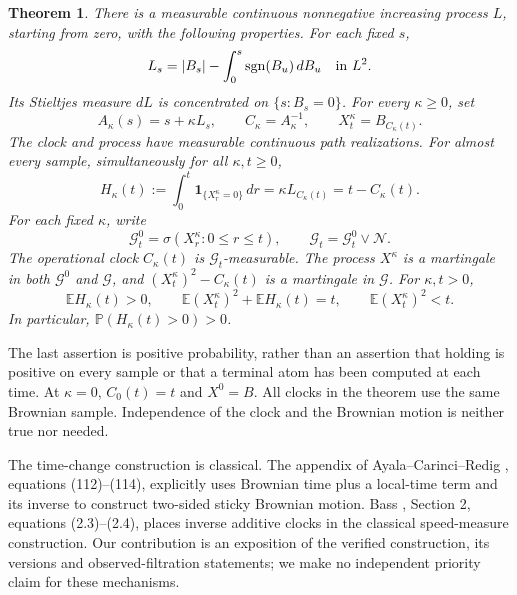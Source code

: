 \documentclass[11pt]{article}
\newtheorem{theorem}{Theorem}[section]
\newcommand{\E}{\mathbb E}
\newcommand{\Pp}{\mathbb P}
\newcommand{\ind}{\mathbf1}
\newcommand{\G}{\mathcal G}
\newcommand{\N}{\mathcal N}
\begin{document}
\begin{theorem}\label{thm:main}
There is a measurable continuous nonnegative increasing process $L$,
starting from zero, with the following properties. For each fixed $s$,
\begin{equation}\label{eq:tanakaL2}
 L_s=|B_s|-\int_0^s\operatorname{sgn}(B_u)\,dB_u\quad\hbox{in }L^2.
\end{equation}
Its Stieltjes measure $dL$ is concentrated on $\{s:B_s=0\}$.
For every $\kappa\geq0$, set
\begin{equation}\label{eq:clocks}
 A_\kappa(s)=s+\kappa L_s,\qquad
 C_\kappa=A_\kappa^{-1},\qquad X_t^\kappa=B_{C_\kappa(t)}.
\end{equation}
The clock and process have measurable continuous path realizations.
For almost every sample, simultaneously for all $\kappa,t\geq0$,
\begin{equation}\label{eq:holding}
 H_\kappa(t):=\int_0^t\ind_{\{X_r^\kappa=0\}}\,dr
 =\kappa L_{C_\kappa(t)}=t-C_\kappa(t).
\end{equation}
For each fixed $\kappa$, write
\[
 \G_t^0=\sigma(X_r^\kappa:0\leq r\leq t),\qquad
 \G_t=\G_t^0\vee\N.
\]
The operational clock $C_\kappa(t)$ is $\G_t$-measurable. The process
$X^\kappa$ is a martingale in both $\G^0$ and $\G$, and
$(X_t^\kappa)^2-C_\kappa(t)$ is a martingale in $\G$.
For $\kappa,t>0$,
\begin{equation}\label{eq:variance}
 \E H_\kappa(t)>0,\qquad
 \E (X_t^\kappa)^2+\E H_\kappa(t)=t,\qquad
 \E (X_t^\kappa)^2<t.
\end{equation}
In particular, $\Pp(H_\kappa(t)>0)>0$.
\end{theorem}

The last assertion is positive probability, rather than an assertion
that holding is positive on every sample or that a terminal atom has
been computed at each time. At $\kappa=0$, $C_0(t)=t$ and $X^0=B$.
All clocks in the theorem use the same Brownian sample. Independence
of the clock and the Brownian motion is neither true nor needed.

The time-change construction is classical. The appendix of
Ayala--Carinci--Redig \cite{ACR}, equations (112)--(114), explicitly
uses Brownian time plus a local-time term and its inverse to construct
two-sided sticky Brownian motion. Bass \cite{Bass}, Section 2,
equations (2.3)--(2.4), places inverse additive clocks in the classical
speed-measure construction. Our contribution is an exposition of the
verified construction, its versions and observed-filtration statements;
we make no independent priority claim for these mechanisms.
\end{document}
